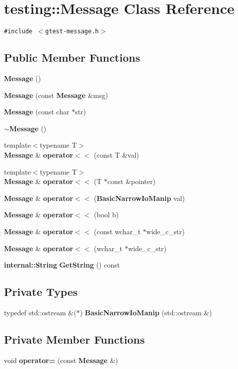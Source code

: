\section{testing::Message Class Reference}
\label{classtesting_1_1Message}
{\tt \#include $<$gtest-message.h$>$}

\subsection*{Public Member Functions}
\begin{CompactItemize}
\item 
{\bf Message} ()
\item 
{\bf Message} (const {\bf Message} \&msg)
\item 
{\bf Message} (const char $\ast$str)
\item 
{\bf $\sim$Message} ()
\item 
{\footnotesize template$<$typename T$>$ }\\{\bf Message} \& {\bf operator$<$$<$} (const T \&val)
\item 
{\footnotesize template$<$typename T$>$ }\\{\bf Message} \& {\bf operator$<$$<$} (T $\ast$const \&pointer)
\item 
{\bf Message} \& {\bf operator$<$$<$} ({\bf BasicNarrowIoManip} val)
\item 
{\bf Message} \& {\bf operator$<$$<$} (bool b)
\item 
{\bf Message} \& {\bf operator$<$$<$} (const wchar\_\-t $\ast$wide\_\-c\_\-str)
\item 
{\bf Message} \& {\bf operator$<$$<$} (wchar\_\-t $\ast$wide\_\-c\_\-str)
\item 
{\bf internal::String} {\bf GetString} () const
\end{CompactItemize}
\subsection*{Private Types}
\begin{CompactItemize}
\item 
typedef std::ostream \&($\ast$) {\bf BasicNarrowIoManip} (std::ostream \&)
\end{CompactItemize}
\subsection*{Private Member Functions}
\begin{CompactItemize}
\item 
void {\bf operator=} (const {\bf Message} \&)
\end{CompactItemize}

